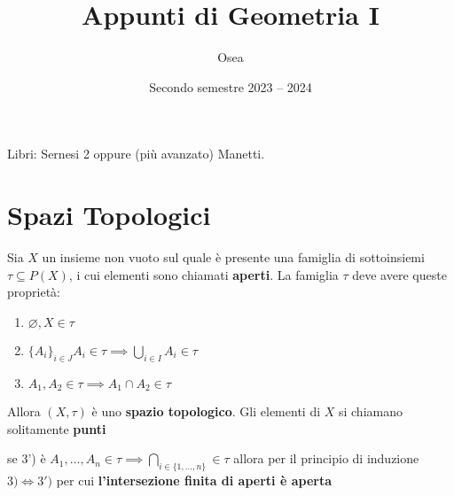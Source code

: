 


\title{Appunti di Geometria I}
\author{Osea}
\date{Secondo semestre 2023 -- 2024}


\maketitle

Libri: Sernesi 2 oppure (più avanzato) Manetti.

\tableofcontents

\section{Spazi Topologici}

\begin{definition}
    Sia \(X\) un insieme non vuoto sul quale è
    presente una famiglia di sottoinsiemi \(\tau \subseteq P(X)\), i cui
    elementi sono chiamati \textbf{aperti}. La famiglia \(\tau\) deve avere
    queste proprietà:
\begin{enumerate}[label = \arabic*)]
    \item \(\varnothing, X \in \tau\) 
    \item \(\{A_{i}\}_{i \in J} A_{i} \in \tau \implies \bigcup_{i \in I} A_{i} \in \tau\)
    \item \(A_{1}, A_{2} \in  \tau \implies  A_{1} \cap A_{2} \in  \tau\) 
\end{enumerate}
    Allora \((X, \tau)\) è uno \textbf{spazio topologico}. Gli elementi di \(X\)
    si chiamano solitamente \textbf{punti}
\end{definition}
\begin{note}
    se 3') è \(A_{1}, \dots, A_{n} \in  \tau \implies  \bigcap_{i \in
    \{1,\dots,n\}} \in  \tau\) allora per il principio di induzione \(3) \iff 3')\) 
    per cui \textbf{l'intersezione finita di aperti è aperta}
\end{note}

